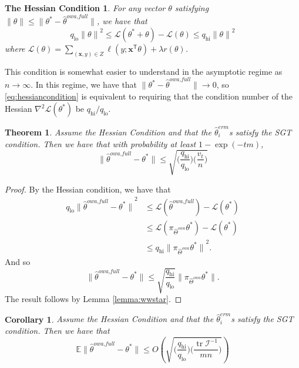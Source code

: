 \documentclass[twoside]{article}
\newtheorem{cor}{Corollary}
\newtheorem{theorem}{Theorem}
\DeclareMathOperator*{\tr}{tr}
\newcommand{\qhi}{q_\text{hi}}
\newcommand{\qlo}{q_\text{lo}}
\newcommand{\Wowa}{{\hat \Theta^{\textit{owa}}}}
\newcommand{\E}{\mathbb{E}}
\newcommand{\x}{\mathbf{x}}
\newcommand{\w}{\theta}
\newcommand{\wowafull}{\hat\w^{\textit{owa,full}}}
\newcommand{\wmle}{\hat\w^{erm}}
\newcommand{\wstar}{{\w^{*}}}
\newcommand{\reg}{r}
\newcommand{\loss}{\ell}
\newcommand{\Loss}{\mathcal{L}}
\newcommand{\I}{\mathcal I}
\newcommand{\trans}[1]{\ensuremath{{#1}^{\mathsf{T}}}}
\newcommand{\ltwo}[1]{{\lVert {#1} \rVert}}
\newcommand{\proj}[1]{\pi_{{#1}}}
\begin{document}
\newtheorem*{cont}{The Hessian Condition}
\begin{cont}
For any vector $\w$ satisfying $\ltwo{\w}\le\ltwo{\wstar-\wowafull}$, we have that
\begin{equation}
\label{eq:hessiancondition}
\qlo\ltwo{\w}^2 \le \Loss(\wstar+\w) - \Loss(\w) \le \qhi\ltwo{\w}^2
\end{equation}
where $\Loss(\w) = \sum_{(\x,y)\in Z}\loss(y;\trans\x\w)+\lambda\reg(\w)$.
\end{cont}

This condition is somewhat easier to understand in the asymptotic regime as $n\to\infty$.
In this regime, we have that $\ltwo{\wstar-\wowafull}\to0$,
so \eqref{eq:hessiancondition} is equivalent to requiring that the condition number of the Hessian $\nabla^2\Loss(\wstar)$ be $\qhi/\qlo$.


\begin{theorem}
\label{theorem:wowafull}
Assume the Hessian Condition and that the $\wmle_i$s satisfy the SGT condition.
Then we have that with probability at least $1-\exp(-tm)$, 
\begin{equation}
\ltwo{\wowafull-\wstar} \le \sqrt{\bigg(\frac{\qhi}{\qlo}\bigg)\bigg(\frac{v_t}{n}\bigg)}
\end{equation}
\end{theorem}

\begin{proof}
By the Hessian condition, we have that
\begin{align}
\qlo\ltwo{\wowafull-\wstar}^2
&\le
\Loss(\wowafull) - \Loss(\wstar)
\\
&\le
\Loss(\proj{\Wowa}\wstar) - \Loss(\wstar)
\\
&\le
\qhi\ltwo{\proj{\Wowa}\wstar}^2
.
\end{align}
And so
\begin{equation}
\ltwo{\wowafull-\wstar} \le \sqrt{\frac{\qhi}{\qlo}}\ltwo{\proj{\Wowa}\wstar}
.
\end{equation}
The result follows by Lemma \ref{lemma:wwstar}.
\end{proof}

\begin{cor}
Assume the Hessian Condition and that the $\wmle_i$s satisfy the SGT condition.
Then we have that
\begin{equation}
\E\ltwo{\wowafull-\wstar} \le
O\left(
\sqrt{
\bigg(\frac{\qhi}{\qlo}\bigg)
\bigg(\frac{\tr{\I^{-1}}}{mn}\bigg)
}
\right)
\end{equation}
\end{cor}
\end{document}
